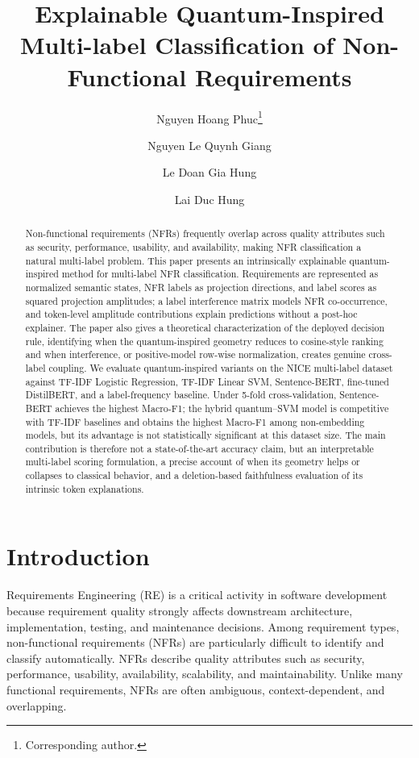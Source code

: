 \documentclass[runningheads]{llncs}
\title{Explainable Quantum-Inspired Multi-label Classification of Non-Functional Requirements}
\author{Nguyen Hoang Phuc\inst{1}\thanks{Corresponding author.} \and
Nguyen Le Quynh Giang\inst{1} \and
Le Doan Gia Hung\inst{1} \and
Lai Duc Hung\inst{1}}
\institute{FPT University, Ho Chi Minh City, 700000, Vietnam \\
\email{nphuc4748@gmail.com, nguyengiang14012005@gmail.com,\\
lhung291005@gmail.com, hungld@fpt.edu.vn}}
\begin{document}
\maketitle

\begin{abstract}
Non-functional requirements (NFRs) frequently overlap across quality attributes
such as security, performance, usability, and availability, making NFR
classification a natural multi-label problem. This paper presents an
intrinsically explainable quantum-inspired method for multi-label NFR
classification. Requirements are represented as normalized semantic states,
NFR labels as projection directions, and label scores as squared projection
amplitudes; a label interference matrix models NFR co-occurrence, and
token-level amplitude contributions explain predictions without a post-hoc
explainer. The paper also gives a theoretical characterization of the deployed
decision rule, identifying when the quantum-inspired geometry reduces to
cosine-style ranking and when interference, or positive-model row-wise
normalization, creates genuine cross-label coupling. We evaluate
quantum-inspired variants on the
NICE multi-label dataset against TF-IDF Logistic Regression, TF-IDF Linear SVM,
Sentence-BERT, fine-tuned DistilBERT, and a label-frequency baseline. Under
5-fold cross-validation, Sentence-BERT achieves the highest Macro-F1; the
hybrid quantum--SVM model is competitive with TF-IDF baselines and obtains the
highest Macro-F1 among non-embedding models, but its advantage is not
statistically significant at this dataset size. The main contribution is
therefore not a state-of-the-art accuracy claim, but an interpretable
multi-label scoring formulation, a precise account of when its geometry helps
or collapses to classical behavior, and a deletion-based faithfulness
evaluation of its intrinsic token explanations.
\end{abstract}

\section{Introduction}
Requirements Engineering (RE) is a critical activity in software development
because requirement quality strongly affects downstream architecture,
implementation, testing, and maintenance decisions. Among requirement types,
non-functional requirements (NFRs) are particularly difficult to identify and
classify automatically. NFRs describe quality attributes such as security,
performance, usability, availability, scalability, and maintainability. Unlike
many functional requirements, NFRs are often ambiguous, context-dependent, and
overlapping.
\end{document}
